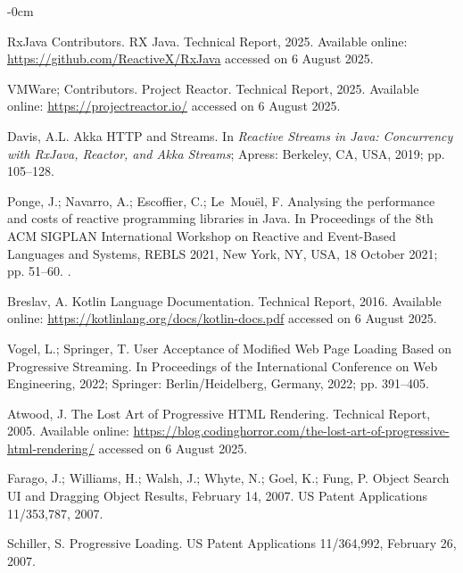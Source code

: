 \documentclass[software,article,accept,pdftex,moreauthors]{Definitions/mdpi}
\begin{document}
\begin{adjustwidth}{-\extralength}{0cm}
\begin{thebibliography}{999}
RxJava Contributors.
\newblock RX Java.
\newblock Technical Report, 2025. Available online: \url{https://github.com/ReactiveX/RxJava} accessed on 6 August 2025.

VMWare; Contributors.
\newblock Project Reactor.
\newblock Technical Report, 2025. Available online: \url{https://projectreactor.io/} accessed on 6 August 2025.

Davis, A.L. Akka HTTP and Streams.
\newblock In {\em Reactive Streams in Java: Concurrency with RxJava, Reactor,
  and Akka Streams}; Apress: Berkeley, CA, USA, 2019; pp. 105--128.

Ponge, J.; Navarro, A.; Escoffier, C.; Le~Mou\"{e}l, F.
\newblock Analysing the performance and costs of reactive programming libraries
  in Java.
\newblock In Proceedings of the 8th ACM SIGPLAN
  International Workshop on Reactive and Event-Based Languages and Systems, REBLS 2021, New
  York, NY, USA, 18 October 2021; pp. 51–60.
.

Breslav, A.
\newblock Kotlin Language Documentation.
\newblock Technical Report, 2016. Available online: \url{https://kotlinlang.org/docs/kotlin-docs.pdf} accessed on 6 August 2025.

Vogel, L.; Springer, T.
\newblock User Acceptance of Modified Web Page Loading Based on Progressive
  Streaming.
\newblock In Proceedings of the International Conference on Web Engineering, 2022;
  Springer:  Berlin/Heidelberg, Germany, 
 2022; pp. 391--405.

Atwood, J.
\newblock The Lost Art of Progressive HTML Rendering.
\newblock Technical Report, 2005.
  Available online: \url{https://blog.codinghorror.com/the-lost-art-of-progressive-html-rendering/} accessed on 6 August 2025.

Farago, J.; Williams, H.; Walsh, J.; Whyte, N.; Goel, K.; Fung, P.
\newblock Object Search UI and Dragging Object Results, February 14, 2007. 
\newblock US Patent Applications 11/353,787, 2007.

Schiller, S.
\newblock Progressive Loading.
\newblock US Patent Applications 11/364,992, February 26, 2007.


\end{thebibliography}
\end{adjustwidth}
\end{document}
